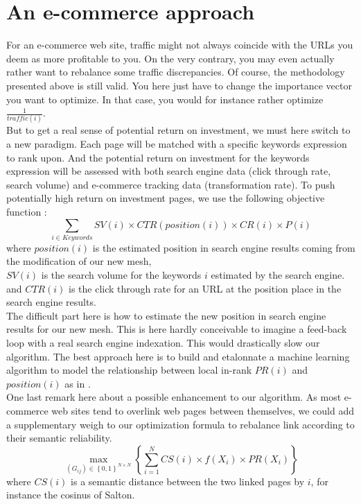 \documentclass{iSWAGArticle}
\begin{document}
\section{An e-commerce approach}
For an e-commerce web site, traffic might not always coincide with the URLs you deem as more profitable to you.
On the very contrary, you may even actually rather want to rebalance some traffic discrepancies.
Of course, the methodology presented above is still valid. You here just have to change the importance vector you want to
optimize. In that case, you would for instance rather optimize $\frac{1}{traffic\left(i\right)}$.
\\\newline
But to get a real sense of potential return on investment, we must here switch to a new paradigm.
Each page will be matched with a specific keywords expression to rank upon. And the potential return on investment for the keywords expression will
be assessed with both search engine data (click through rate, search volume) and e-commerce tracking data (transformation rate).
To push potentially high return on investment pages, we use the following objective function :
\begin{equation}
 \sum_{i\in Keywords} SV\left( i\right)\times CTR\left(position\left(i\right)\right)\times CR\left(i\right)\times P\left(i\right)
\end{equation}
where $position\left(i\right)$ is the estimated position in search engine results coming from the modification of our new mesh,
\\\newline
$SV\left(i\right)$ is the search volume for the keywords $i$ estimated by the search engine.
\\\newline
and $CTR\left(i\right)$ is the click through rate for an URL at the position place in the search engine results.
\\\newline
The difficult part here is how to estimate the new position in search engine results for our new mesh.
This is here hardly conceivable to imagine a feed-back loop with a real search engine indexation. This would drastically
slow our algorithm. The best approach here is to build and etalonnate a machine learning algorithm to model the relationship between local in-rank $PR\left(i\right)$
and $position(i)$ as in \cite{learning_to_rank}.
\\\newline
One last remark here about a possible enhancement to our algorithm. As most e-commerce web sites tend to overlink web pages between themselves, 
we could add a supplementary weigh to our optimization formula to rebalance link according to their semantic reliability.
\begin{equation}
\max_{\left(G_{ij}\right)  \in \left\{0,1\right\}^{N\times N}}\left\{ \sum^{N}_{i=1} CS\left(i\right)\times f\left(X_i\right)\times PR(X_i)\right\}
\end{equation}
where $CS(i)$ is a semantic distance between the two linked pages by $i$, for instance the cosinus of Salton. 
\end{document}
